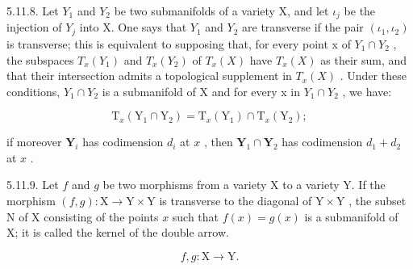 5.11.8. Let \(Y_{1}\) and \(Y_{2}\) be two submanifolds of a variety X, and let \(\iota_{j}\) be the injection of \(Y_{j}\) into X. One says that \(Y_{1}\) and \(Y_{2}\) are transverse if the pair \((\iota_{1},\iota_{2})\) is transverse; this is equivalent to supposing that, for every point x of \(Y_{1}\cap Y_{2}\) , the subspaces \(T_{x}(Y_{1})\) and \(T_{x}(Y_{2})\) of \(T_{x}(X)\) have \(T_{x}(X)\) as their sum, and that their intersection admits a topological supplement in \(T_{x}(X)\) . Under these conditions, \(Y_{1}\cap Y_{2}\) is a submanifold of X and for every x in \(Y_{1}\cap Y_{2}\) , we have:

\[
\mathrm{T} _ {x} (\mathrm{Y} _ {1} \cap \mathrm{Y} _ {2}) = \mathrm{T} _ {x} (\mathrm{Y} _ {1}) \cap \mathrm{T} _ {x} (\mathrm{Y} _ {2});
\]

if moreover \(\mathbf{Y}_i\) has codimension \(d_i\) at \(x\) , then \(\mathbf{Y}_1 \cap \mathbf{Y}_2\) has codimension \(d_1 + d_2\) at \(x\) .

5.11.9. Let \(f\) and \(g\) be two morphisms from a variety X to a variety Y. If the morphism \((f,g):\mathrm{X}\to\mathrm{Y}\times\mathrm{Y}\) is transverse to the diagonal of \(\mathrm{Y}\times\mathrm{Y}\) , the subset N of X consisting of the points \(x\) such that \(f(x)=g(x)\) is a submanifold of X; it is called the kernel of the double arrow.

\[
f, g: \mathrm{X} \longrightarrow \mathrm{Y}.
\]

